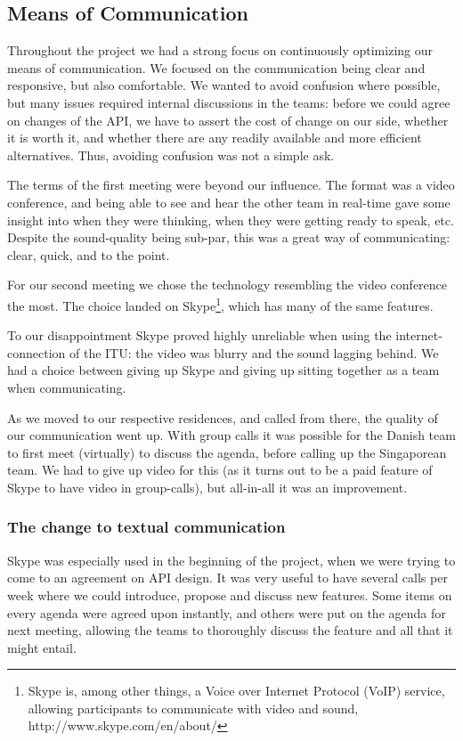 \subsection{Means of Communication}

Throughout the project we had a strong focus on continuously optimizing our
means of communication. We focused on the communication being clear and
responsive, but also comfortable. We wanted to avoid confusion where possible,
but many issues required internal discussions in the teams: before we could agree 
on changes of the API, we have to assert the cost of change on our side, whether it
is worth it, and whether there are any readily available and more efficient
alternatives. Thus, avoiding confusion was not a simple ask.

The terms of the first meeting were beyond our influence. The format was a
video conference, and being able to see and hear the
other team in real-time gave some insight into when they were thinking, when
they were getting ready to speak, etc. Despite the sound-quality being sub-par,
this was a great way of communicating: clear, quick, and to the point.

For our second meeting we chose the technology resembling the video conference
the most. The choice landed on Skype\footnote{ Skype is, among other things, a
Voice over Internet Protocol (VoIP) service, allowing participants to
communicate with video and sound, http://www.skype.com/en/about/}, which has
many of the same features.

To our disappointment Skype proved highly unreliable when using the internet-connection of the ITU: the video was blurry
and the sound lagging behind. We had a choice between giving up Skype and giving up sitting together as a team when communicating.

As we moved to our respective residences, and called from there, the quality of our communication went up. With group calls it was
possible for the Danish team to first meet (virtually) to discuss the agenda, before calling up the Singaporean team. We had to give
up video for this (as it turns out to be a paid feature of Skype to have video in group-calls), but all-in-all it was an improvement.

\subsubsection{The change to textual communication}
Skype was especially used in the beginning of the project, when we were trying to come to an agreement on API design. It was very
useful to have several calls per week where we could introduce, propose and discuss new features. Some items on every agenda were
agreed upon instantly, and others were put on the agenda for next meeting, allowing the teams to thoroughly discuss the feature
and all that it might entail.

